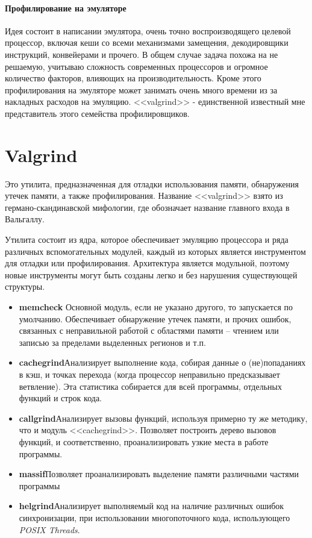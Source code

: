 \documentclass[12pt]{article}
\begin{document}
\paragraph*{Профилирование на эмуляторе} Идея состоит в написании эмулятора, очень точно воспроизводящего целевой процессор, включая кеши со всеми механизмами замещения, декодировщики инструкций, конвейерами и прочего. В общем случае задача похожа на не решаемую, учитываю сложность современных процессоров и огромное количество факторов, влияющих на производительность. Кроме этого профилирования на эмуляторе может занимать очень много времени из за накладных расходов на эмуляцию. <<valgrind>> - единственной известный мне представитель этого семейства профилировщиков.


\section*{Valgrind}

 Это утилита, предназначенная для отладки использования памяти, обнаружения утечек памяти, а также профилирования. Название <<valgrind>> взято из германо-скан\-динавской мифологии, где обозначает название главного входа в Вальгаллу.
 
Утилита состоит из ядра, которое обеспечивает эмуляцию процессора и ряда различных вспомогательных модулей, каждый из которых является инструментом для отладки или профилирования. Архитектура является модульной, поэтому новые инструменты могут быть созданы легко и без нарушения существующей структуры.

\begin{itemize}
\item {\bf memcheck} \subitem Основной модуль, если не указано другого, то запускается по умолчанию.  Обеспечивает обнаружение утечек памяти, и прочих ошибок, связанных с неправильной работой с областями памяти -- чтением или записью за пределами выделенных регионов и т.п.
\item {\bf cachegrind}\subitem Анализирует выполнение кода, собирая данные о (не)попаданиях в кэш, и точках перехода (когда процессор неправильно предсказывает ветвление). Эта статистика собирается для всей программы, отдельных функций и строк кода.
\item {\bf callgrind}\subitem Анализирует вызовы функций, используя примерно ту же методику, что и модуль <<cachegrind>>. Позволяет построить дерево вызовов функций, и соответственно, проанализировать узкие места в работе программы.
\item {\bf massif}\subitem Позволяет проанализировать выделение памяти различными частями программы
\item {\bf helgrind}\subitem Анализирует выполняемый код на наличие различных ошибок синхронизации, при использовании многопоточного кода, использующего {\it POSIX Threads}.
\end{itemize}
\end{document}
